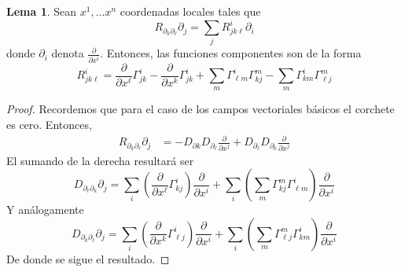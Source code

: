 \documentclass[spanish]{book}
\theoremstyle{definition}
\newtheorem*{lema}{Lema}
\begin{document}
	\begin{lema}
		Sean $x^1,\ldots x^n$ coordenadas locales tales que
		\[R_{\partial_k\partial_\ell}\partial_j=\sum_jR^i_{jk\ell}\partial_i\]
		donde $\partial_i$ denota $\frac{\partial}{\partial x^i}$. Entonces, las funciones componentes son de la forma
		\[R_{jk\ell}^i=\frac{\partial}{\partial x^\ell}\Gamma_{jk}^i-\frac{\partial}{\partial x^k}\Gamma_{jk}^i+\sum_m\Gamma_{\ell m}^i\Gamma_{kj}^m-\sum_m\Gamma_{km}^i\Gamma_{\ell j}^m\]
	\end{lema}
	\begin{proof}
		Recordemos que para el caso de los campos vectoriales básicos el corchete es cero. Entonces,
		\begin{align*}
			R_{\partial_k\partial_\ell}\partial_j&=-D_{\partial k}D_{\partial_\ell}\frac{\partial}{\partial x^j}+D_{\partial_\ell}D_{\partial_k}\frac{\partial}{\partial x^j}
		\end{align*}
		El sumando de la derecha resultará ser
		\[D_{\partial_\ell\partial_k}\partial_j=\sum_i\left(\frac{\partial}{\partial x^\ell}\Gamma^i_{kj}\right)\frac{\partial}{\partial x^i}+\sum_i\left(\sum_m\Gamma^m_{kj}\Gamma^i_{\ell m}\right)\frac{\partial}{\partial x^i}\]
		Y análogamente
		\[D_{\partial_k\partial_\ell}\partial_j=\sum_i\left(\frac{\partial}{\partial x^k}\Gamma^i_{\ell j}\right)\frac{\partial}{\partial x^i}+\sum_i\left(\sum_m\Gamma^m_{\ell j}\Gamma^i_{k m}\right)\frac{\partial}{\partial x^i}\]
		De donde se sigue el resultado.
	\end{proof}
	
\end{document}
